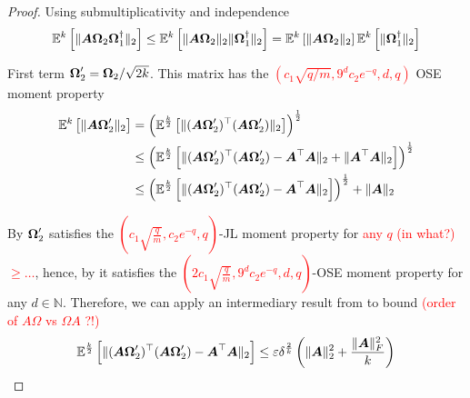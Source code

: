 \documentclass[12pt]{article}
\begin{document}
\begin{proof}
Using submultiplicativity and independence
\begin{equation}
    \mathbb{E}^{k}\left[ \lVert \boldsymbol{A} \boldsymbol{\Omega}_2 \boldsymbol{\Omega}_1^{\dagger} \rVert _2 \right]
    \leq \mathbb{E}^{k}\left[ \lVert \boldsymbol{A} \boldsymbol{\Omega}_2 \rVert _2 \lVert \boldsymbol{\Omega}_1^{\dagger} \rVert _2 \right]
    = \mathbb{E}^{k}\left[ \lVert \boldsymbol{A} \boldsymbol{\Omega}_2 \rVert _2 \right] \mathbb{E}^{k}\left[  \lVert \boldsymbol{\Omega}_1^{\dagger} \rVert _2 \right]
\end{equation}

First term $\boldsymbol{\Omega}_2' = \boldsymbol{\Omega}_2 / \sqrt{2k}$. This matrix has the \textcolor{red}{$(c_1\sqrt{q/m}, 9^d c_2e^{-q}, d, q)$} OSE moment property
\begin{align}
    \mathbb{E}^{k}\left[ \lVert \boldsymbol{A} \boldsymbol{\Omega}_2' \rVert _2 \right]
    &= \left(\mathbb{E}^{\frac{k}{2}}\left[ \lVert (\boldsymbol{A} \boldsymbol{\Omega}_2')^{\top} (\boldsymbol{A} \boldsymbol{\Omega}_2') \rVert _2 \right]\right)^{\frac{1}{2}} \notag \\
    &\leq \left( \mathbb{E}^{\frac{k}{2}}\left[ \lVert (\boldsymbol{A} \boldsymbol{\Omega}_2')^{\top} (\boldsymbol{A} \boldsymbol{\Omega}_2') - \boldsymbol{A}^{\top} \boldsymbol{A} \rVert _2 + \lVert \boldsymbol{A}^{\top} \boldsymbol{A} \rVert _2 \right]\right)^{\frac{1}{2}} \notag \\
    &\leq \left( \mathbb{E}^{\frac{k}{2}}\left[ \lVert (\boldsymbol{A} \boldsymbol{\Omega}_2')^{\top} (\boldsymbol{A} \boldsymbol{\Omega}_2') - \boldsymbol{A}^{\top} \boldsymbol{A} \rVert _2\right]\right)^{\frac{1}{2}} + \lVert \boldsymbol{A} \rVert _2
\end{align}

By \cite{} $\boldsymbol{\Omega}_2'$ satisfies the \textcolor{red}{$(c_1 \sqrt{\frac{q}{m}}, c_2 e^{-q}, q)$}-JL moment property for \textcolor{red}{any $q$ (in what?)} \textcolor{red}{$\geq \dots$}, hence, by \cite[Lemma 4]{cohen-2016-optimal-approximate} it satisfies the \textcolor{red}{$(2 c_1 \sqrt{\frac{q}{m}}, 9^d c_2 e^{-q}, d, q)$}-OSE moment property for any $d \in \mathbb{N}$. Therefore, we can apply an intermediary result from \cite[Proof of Theorem 1]{cohen-2016-optimal-approximate} to bound \textcolor{red}{(order of $A\Omega$ vs $\Omega A$ ?!)}
\begin{equation}
    \mathbb{E}^{\frac{k}{2}}\left[ \lVert (\boldsymbol{A} \boldsymbol{\Omega}_2')^{\top} (\boldsymbol{A} \boldsymbol{\Omega}_2') - \boldsymbol{A}^{\top} \boldsymbol{A} \rVert _2\right] \leq \varepsilon \delta^{\frac{2}{k}}\left( \lVert \boldsymbol{A} \rVert _2^2 + \frac{\lVert \boldsymbol{A} \rVert _F^2}{k} \right)
\end{equation}


\end{proof}
\end{document}
